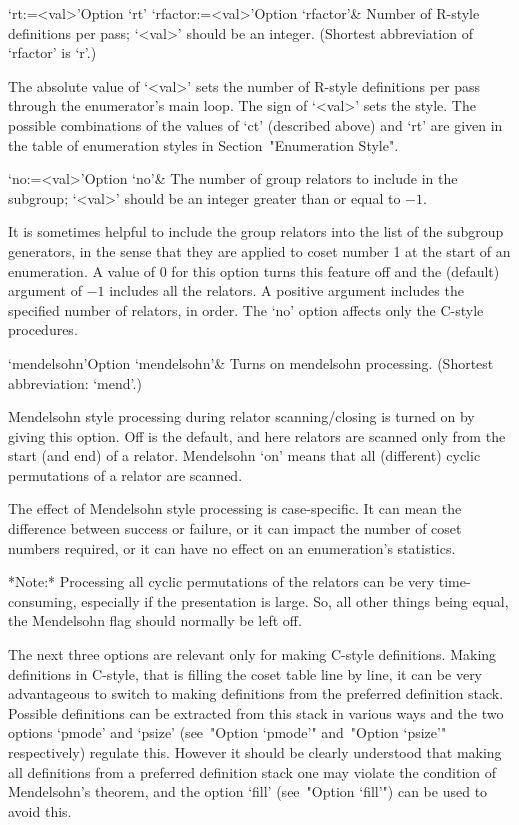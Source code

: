 \>`rt:=<val>'{Option `rt'}
\>`rfactor:=<val>'{Option `rfactor'}&
Number of R-style definitions per pass; `<val>' should be an  integer. 
(Shortest abbreviation of `rfactor' is `r'.)

The absolute value of `<val>' sets the
number of R-style definitions per  pass through  the enumerator's main
loop. The sign of `<val>'  sets the  style. The possible  combinations
of the values of `ct' (described above)  and  `rt'  are  given in  the
table of  enumeration styles in Section~"Enumeration Style".

\>`no:=<val>'{Option `no'}&
The number of group relators to include in the subgroup;  
`<val>' should be an integer greater than or equal to $-1$.

It is sometimes helpful to include the group relators into the list of
the subgroup generators, in the sense that they are applied  to  coset
number 1 at the start of an enumeration. A value of 0 for this  option
turns this feature off and the (default) argument of $-1$ includes all
the relators. A positive argument includes  the  specified  number  of
relators,  in  order.  The  `no'  option  affects  only  the   C-style
procedures.

\>`mendelsohn'{Option `mendelsohn'}&
Turns on mendelsohn processing. (Shortest abbreviation: `mend'.)

Mendelsohn style processing during relator scanning/closing is  turned
on by giving this option. Off is the default, and  here  relators  are
scanned only from  the  start  (and  end)  of  a  relator.  Mendelsohn
\lq{}on' means that all (different) cyclic permutations of  a  relator
are scanned.

The effect of Mendelsohn style processing  is  case-specific.  It  can
mean the difference between success or failure, or it can  impact  the
number of coset numbers required, or it  can  have  no  effect  on  an
enumeration's statistics.

*Note:* Processing all cyclic permutations of the relators can be very
time-consuming,  especially if  the  presentation is  large.  So,  all
other things being equal, the  Mendelsohn flag should normally be left
off.

\enditems


The  next  three  options  are  relevant  only  for   making   C-style
definitions. Making definitions in C-style, that is filling the  coset
table line by line, it can be very advantageous to  switch  to  making
definitions from the preferred definition stack. Possible  definitions
can be extracted from this stack in various ways and the  two  options
`pmode'  and  `psize'  (see~"Option  `pmode'"   and~"Option   `psize'"
respectively) regulate this. However it should be  clearly  understood
that making all definitions from a preferred definition stack one  may
violate the condition of Mendelsohn's theorem, and the  option  `fill'
(see~"Option `fill'") can be used to avoid this.

